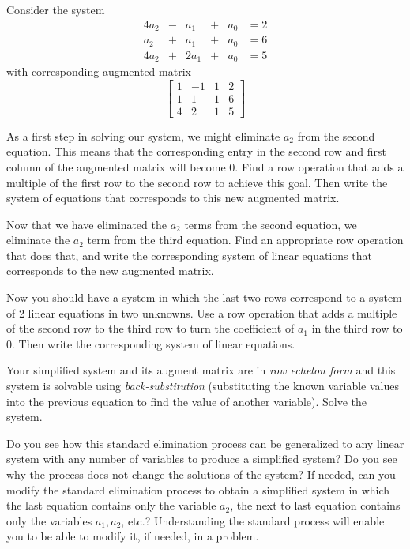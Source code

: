 \begin{activity} \label{act:A1.2_1} Consider the system 
\begin{alignat*}{4}
{}a_2	&{}-{} 	&{}a_1 	&{}+{}	&{}a_0 	&= 2   \\
{}a_2 	&{}+{}	&{}a_1 	&{}+{}	&{}a_0  &= 6   \\
4a_2 		&{}+{} 	&2a_1 	&{}+{} 	&{}a_0 	&= 5
\end{alignat*} 
with corresponding augmented matrix
\[\left[ \begin{array}{crc|c}
1 	&-1		&1 	&2 \\
1	&1		&1	&6 \\
4	&2		&1	&5
\end{array} \right]
\]
	\ba
	\item As a first step in solving our system, we might eliminate $a_2$ from the second equation. This means that the corresponding entry in the second row and first column of the augmented matrix will become 0. Find a row operation that adds a multiple of the first row to the second row to achieve this goal. Then write the system of equations that corresponds to this new augmented matrix. 

	\item Now that we have eliminated the $a_2$ terms from the second equation, we eliminate the $a_2$ term from the third equation. Find an appropriate row operation that does that, and write the corresponding system of linear equations that corresponds to the new augmented matrix. 

	\item Now you should have a system in which the last two rows correspond to a system of 2 linear equations in two unknowns. Use a row operation that adds a multiple of the second row to the third row to turn the coefficient of $a_1$ in the third row to 0. Then write the corresponding system of linear equations. 

	\item Your simplified system and its augment matrix are in \emph{row echelon form} and this system is solvable using \emph{back-substitution} (substituting the known variable values into the previous equation to find the value of another variable). Solve the system. 	

	\ea

\end{activity}

\begin{reflect}Do you see how this standard elimination process can be generalized to any linear system with any number of variables to produce a simplified system? Do you see why the process does not change the solutions of the system? If needed, can you modify the standard elimination process to obtain a simplified system in which the last equation contains only the variable $a_2$, the next to last equation contains only the variables $a_1, a_2$, etc.? Understanding the standard process will enable you to be able to modify it, if needed, in a problem.
\end{reflect}
 



